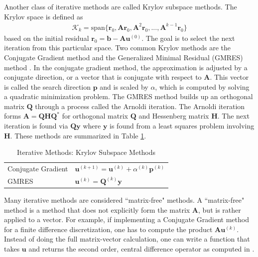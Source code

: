 Another class of iterative methods are called Krylov subspace methods. The Krylov space is defined as
\begin{align}
\mathcal{K}_k = \text{span} \{ \textbf{r}_0, \textbf{A} \textbf{r}_0, \textbf{A}^2 \textbf{r}_0, ..., \textbf{A}^{k-1} \textbf{r}_0 \}
\end{align}
based on the initial residual $\textbf{r}_0 = \textbf{b} - \textbf{A} \textbf{u}^{(0)}$. The goal is to select the next iteration from this particular space. Two common Krylov methods are the Conjugate Gradient method \citep{hestenes1952methods} and the Generalized Minimal Residual (GMRES) method \citep{saad1986gmres}. In the conjugate gradient method, the approximation is adjusted by a conjugate direction, or a vector that is conjugate with respect to $\textbf{A}$. This vector is called the search direction $\textbf{p}$ and is scaled by $\alpha$, which is computed by solving a quadratic minimization problem. The GMRES method builds up an orthogonal matrix $\textbf{Q}$ through a process called the Arnoldi iteration. The Arnoldi iteration forms $\textbf{A} = \textbf{Q} \textbf{H} \textbf{Q}^*$ for orthogonal matrix $\textbf{Q}$ and Hessenberg matrix $\textbf{H}$. The next iteration is found via $\textbf{Q} \textbf{y}$ where $\textbf{y}$ is found from a least squares problem involving $\textbf{H}$. These methods are summarized in Table \ref{tab:ksm}.

\begin{table}[h!]
    \centering
    \begin{tabular}{ | l | l |}
        \hline
        Conjugate Gradient & $\textbf{u}^{(k+1)} = \textbf{u}^{(k)} + \alpha^{(k)} \textbf{p}^{(k)}$ \\
        GMRES & $\textbf{u}^{(k)} = \textbf{Q}^{(k)} \textbf{y}$ \\
        \hline
    \end{tabular}
    \caption{Iterative Methods: Krylov Subspace Methods}
    \label{tab:ksm}
\end{table}

Many iterative methods are considered ``matrix-free" methods. A ``matrix-free" method is a method that does not explicitly form the matrix $\textbf{A}$, but is rather applied to a vector. For example, if implementing a Conjugate Gradient method for a finite difference discretization, one has to compute the product $\textbf{A} \textbf{u}^{(k)}$. Instead of doing the full matrix-vector calculation, one can write a function that takes $\textbf{u}$ and returns the second order, central difference operator as computed in .

